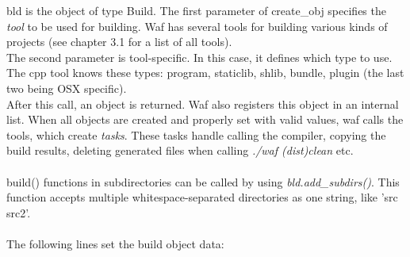 \documentclass[a4paper,10pt]{article}
\begin{document}
bld is the object of type Build. The first parameter of create\_obj specifies the \emph{tool} to be used for building. Waf has several tools for building various kinds of projects (see chapter 3.1 for a list of all tools).\\
The second parameter is tool-specific. In this case, it defines which type to use. The cpp tool  knows these types: program, staticlib, shlib, bundle, plugin (the last two being OSX specific).\\
After this call, an object is returned. Waf also registers this object in an internal list. When all objects are created and properly set with valid values, waf calls the tools, which create \emph{tasks}. These tasks handle calling the compiler, copying the build results, deleting generated files when calling \emph{./waf (dist)clean} etc.\\
\\
build() functions in subdirectories can be called by using \emph{bld.add\_subdirs()}. This function accepts multiple whitespace-separated directories as one string, like 'src src2'.\\
\\
The following lines set the build object data:
\end{document}
